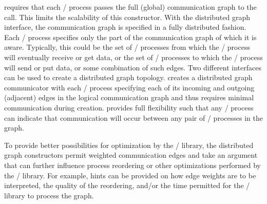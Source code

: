 requires that each \MPI/ process passes the
full (global) communication graph to the call. This limits the
scalability of this constructor. With the distributed graph interface,
the communication graph is specified in a fully distributed
fashion. Each \MPI/ process specifies only the part of the communication
graph of which it is aware. Typically, this could be the set of
\MPI/ processes from which the \MPI/ process will eventually receive or get data,
or the set of \MPI/ processes to which the \MPI/ process will send or put data, or
some combination of such edges.  Two different interfaces can be used
to create a distributed graph
topology.  creates a
distributed graph communicator with each \MPI/ process specifying each of its
incoming and outgoing (adjacent) edges in the logical communication
graph and thus requires minimal communication during
creation. 
provides full flexibility such that any \MPI/ process can indicate that
communication will occur between any pair of \MPI/ processes in the graph.

To provide better possibilities for optimization by the \MPI/ library,
the distributed graph constructors permit weighted communication edges
and take an  argument that can further influence process
reordering or other optimizations performed by the \MPI/ library. For
example, hints can be provided on how edge weights are to be
interpreted, the quality of the reordering, and/or the time permitted
for the \MPI/ library to process the graph.

